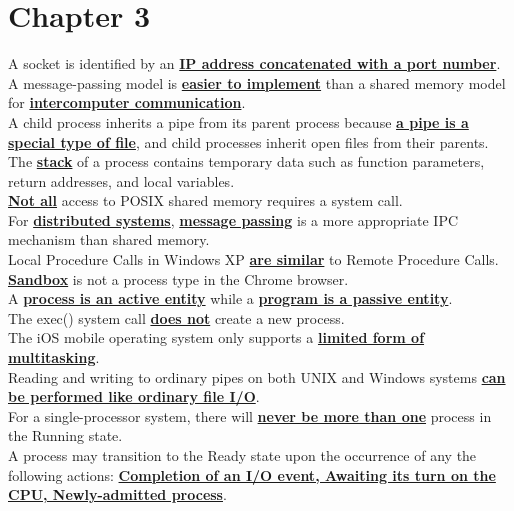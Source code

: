 \documentclass[10pt]{article}
\newcommand{\qw}[1]{\textbf{\ul{#1}}}
\begin{document}
\section*{\centering Chapter 3}
A socket is identified by an \qw{IP address concatenated with a port number}.\\[2mm]
A message-passing model is \qw{easier to implement} than a shared memory model for \qw{intercomputer communication}.\\[2mm]
A child process inherits a pipe from its parent process because \qw{a pipe is a special type of file}, and child processes inherit open files from their parents.\\[2mm]
The \qw{stack} of a process contains temporary data such as function parameters, return addresses, and local variables.\\[2mm]
\qw{Not all} access to POSIX shared memory requires a system call.\\[2mm]
For \qw{distributed systems}, \qw{message passing} is a more appropriate IPC mechanism than shared memory.\\[2mm]
Local Procedure Calls in Windows XP \qw{are similar} to Remote Procedure Calls.\\[2mm]
\qw{Sandbox} is not a process type in the Chrome browser.\\[2mm]
A \qw{process is an active entity} while a \qw{program is a passive entity}.\\[2mm]
The exec() system call \qw{does not} create a new process.\\[2mm]
The iOS mobile operating system only supports a \qw{limited form of multitasking}.\\[2mm]
Reading and writing to ordinary pipes on both UNIX and Windows systems \qw{can be performed like ordinary file I/O}.\\[2mm]
For a single-processor system, there will \qw{never be more than one} process in the Running state.\\[2mm]
A process may transition to the Ready state upon the occurrence of any the following actions:
\qw{Completion of an I/O event, Awaiting its turn on the CPU, Newly-admitted process}.
\newpage
\end{document}
